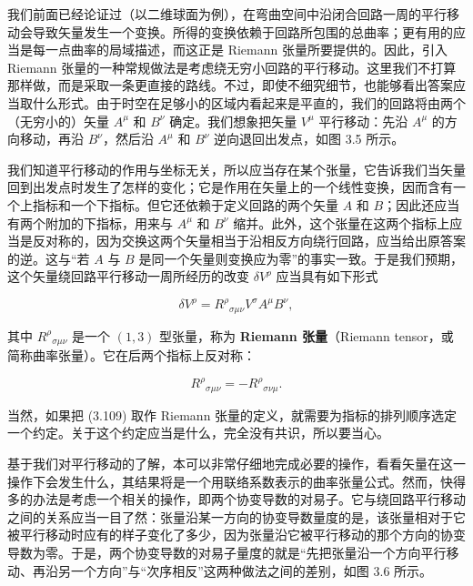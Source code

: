 我们前面已经论证过（以二维球面为例），在弯曲空间中沿闭合回路一周的平行移动会导致矢量发生一个变换。所得的变换依赖于回路所包围的总曲率；更有用的应当是每一点曲率的局域描述，而这正是 Riemann 张量所要提供的。因此，引入 Riemann 张量的一种常规做法是考虑绕无穷小回路的平行移动。这里我们不打算那样做，而是采取一条更直接的路线。不过，即使不细究细节，也能够看出答案应当取什么形式。由于时空在足够小的区域内看起来是平直的，我们的回路将由两个（无穷小的）矢量 $A^\mu$ 和 $B^\nu$ 确定。我们想象把矢量 $V^\mu$ 平行移动：先沿 $A^\mu$ 的方向移动，再沿 $B^\nu$，然后沿 $A^\mu$ 和 $B^\nu$ 逆向退回出发点，如图 3.5 所示。


我们知道平行移动的作用与坐标无关，所以应当存在某个张量，它告诉我们当矢量回到出发点时发生了怎样的变化；它是作用在矢量上的一个线性变换，因而含有一个上指标和一个下指标。但它还依赖于定义回路的两个矢量 $A$ 和 $B$；因此还应当有两个附加的下指标，用来与 $A^\mu$ 和 $B^\nu$ 缩并。此外，这个张量在这两个指标上应当是反对称的，因为交换这两个矢量相当于沿相反方向绕行回路，应当给出原答案的逆。这与“若 $A$ 与 $B$ 是同一个矢量则变换应为零”的事实一致。于是我们预期，这个矢量绕回路平行移动一周所经历的改变 $\delta V^\rho$ 应当具有如下形式

\begin{equation*}
\delta V^\rho = R^\rho{}_{\sigma\mu\nu} V^\sigma A^\mu B^\nu, \tag{3.109}
\end{equation*}

其中 $R^\rho{}_{\sigma\mu\nu}$ 是一个 $(1,3)$ 型张量，称为 \textbf{Riemann 张量}（Riemann tensor，或简称曲率张量）。它在后两个指标上反对称：

\begin{equation*}
R^\rho{}_{\sigma\mu\nu} = -R^\rho{}_{\sigma\nu\mu}. \tag{3.110}
\end{equation*}

当然，如果把 (3.109) 取作 Riemann 张量的定义，就需要为指标的排列顺序选定一个约定。关于这个约定应当是什么，完全没有共识，所以要当心。

基于我们对平行移动的了解，本可以非常仔细地完成必要的操作，看看矢量在这一操作下会发生什么，其结果将是一个用联络系数表示的曲率张量公式。然而，快得多的办法是考虑一个相关的操作，即两个协变导数的对易子。它与绕回路平行移动之间的关系应当一目了然：张量沿某一方向的协变导数量度的是，该张量相对于它被平行移动时应有的样子变化了多少，因为张量沿它被平行移动的那个方向的协变导数为零。于是，两个协变导数的对易子量度的就是“先把张量沿一个方向平行移动、再沿另一个方向”与“次序相反”这两种做法之间的差别，如图 3.6 所示。

